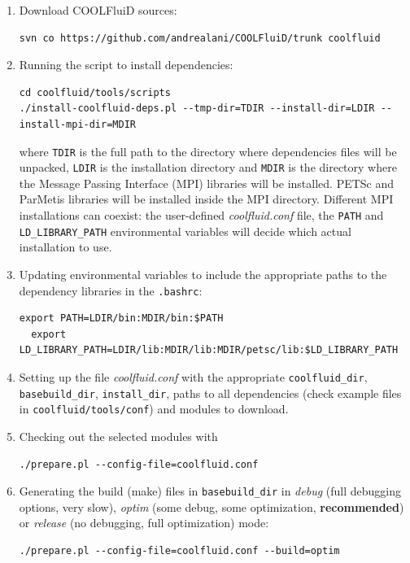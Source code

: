 \documentclass[11pt]{article}
\begin{document}
\begin{enumerate}
\item
  Download COOLFluiD sources: 
\begin{lstlisting}[breaklines]
svn co https://github.com/andrealani/COOLFluiD/trunk coolfluid
\end{lstlisting}
\item
  Running the script to install dependencies:
\begin{lstlisting}[breaklines]
cd coolfluid/tools/scripts
./install-coolfluid-deps.pl --tmp-dir=TDIR --install-dir=LDIR --install-mpi-dir=MDIR
\end{lstlisting}
  where \texttt{TDIR} is the full path to the directory where dependencies files will be unpacked,
  \texttt{LDIR} is the installation directory and \texttt{MDIR} is the directory where the 
  Message Passing Interface (MPI) libraries will be installed. PETSc and ParMetis libraries will be installed 
  inside the MPI directory. Different MPI installations can coexist: the user-defined \textit{coolfluid.conf} file,
  the \texttt{PATH} and \texttt{LD\_LIBRARY\_PATH} environmental variables will decide which actual installation to use.
\item
  Updating environmental variables to include the appropriate paths to the dependency libraries 
  in the \texttt{.bashrc}:
\begin{lstlisting}[breaklines]
  export PATH=LDIR/bin:MDIR/bin:$PATH
  export LD_LIBRARY_PATH=LDIR/lib:MDIR/lib:MDIR/petsc/lib:$LD_LIBRARY_PATH
\end{lstlisting}  
\item
  Setting up the file \textit{coolfluid.conf} with the appropriate \texttt{coolfluid\_dir},
  \texttt{basebuild\_dir}, \texttt{install\_dir}, paths to all dependencies (check example files in 
  \texttt{coolfluid/tools/conf}) and modules to download.
\item
  Checking out the selected modules with
\begin{lstlisting}[breaklines]
./prepare.pl --config-file=coolfluid.conf
\end{lstlisting}
\item
  Generating the build (make) files in \texttt{basebuild\_dir} in \textit{debug} (full debugging options, very slow), 
  \textit{optim} (some debug, some optimization, \textbf{recommended}) or \textit{release} (no debugging, full optimization) mode:
\begin{lstlisting}[breaklines]
./prepare.pl --config-file=coolfluid.conf --build=optim
\end{lstlisting}

\end{enumerate}
\end{document}
